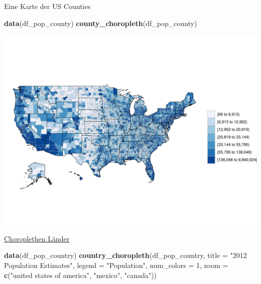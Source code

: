 \documentclass[ignorenonframetext,]{beamer}
\newenvironment{Shaded}{\begin{snugshade}}{\end{snugshade}}
\newcommand{\DataTypeTok}[1]{\textcolor[rgb]{0.13,0.29,0.53}{#1}}
\newcommand{\DecValTok}[1]{\textcolor[rgb]{0.00,0.00,0.81}{#1}}
\newcommand{\KeywordTok}[1]{\textcolor[rgb]{0.13,0.29,0.53}{\textbf{#1}}}
\newcommand{\NormalTok}[1]{#1}
\newcommand{\StringTok}[1]{\textcolor[rgb]{0.31,0.60,0.02}{#1}}
\begin{document}
\begin{frame}[fragile]{Eine Karte der US Counties}
\protect\hypertarget{eine-karte-der-us-counties}{}

\begin{Shaded}
\begin{Highlighting}[]
\KeywordTok{data}\NormalTok{(df_pop_county)}
\KeywordTok{county_choropleth}\NormalTok{(df_pop_county)}
\end{Highlighting}
\end{Shaded}

\includegraphics{Choroplethen_files/figure-beamer/unnamed-chunk-22-1.pdf}

\end{frame}

\begin{frame}[fragile]{\href{http://mirrors.softliste.de/cran/web/packages/choroplethr/vignettes/d-country-choropleth.html}{Choroplethen
Länder}}
\protect\hypertarget{choroplethen-lander}{}

\begin{Shaded}
\begin{Highlighting}[]
\KeywordTok{data}\NormalTok{(df_pop_country)}
\KeywordTok{country_choropleth}\NormalTok{(df_pop_country,}
              \DataTypeTok{title      =} \StringTok{"2012 Population Estimates"}\NormalTok{,}
              \DataTypeTok{legend     =} \StringTok{"Population"}\NormalTok{,}
              \DataTypeTok{num_colors =} \DecValTok{1}\NormalTok{,}
              \DataTypeTok{zoom       =} \KeywordTok{c}\NormalTok{(}\StringTok{"united states of america"}\NormalTok{,}
                             \StringTok{"mexico"}\NormalTok{, }\StringTok{"canada"}\NormalTok{))}
\end{Highlighting}
\end{Shaded}

\end{frame}
\end{document}
